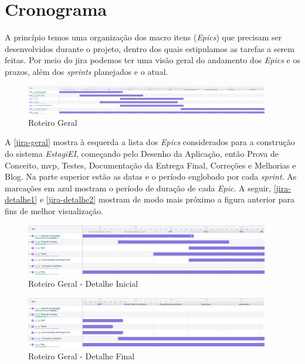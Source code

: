 \section{Cronograma}

A princípio temos uma organização dos macro itens (\textit{Epics}) que precisam ser desenvolvidos durante o projeto, dentro dos quais estipulamos as tarefas a serem feitas. Por meio do \gls{jira} podemos ter uma visão geral do andamento dos \textit{Epics} e os prazos, além dos \textit{\glspl{sprint}} planejados e o atual.

\begin{figure}[H]
	\centering
	\caption{\label{jira-geral}Roteiro Geral}
	\includegraphics[width=0.95\textwidth]{../imagens/cronograma-geral.png}
\end{figure}

A \autoref{jira-geral} mostra à esquerda a lista dos \textit{Epics} considerados para a construção do sistema \emph{EstagiEI}, começando pelo Desenho da Aplicação, então Prova de Conceito, \ac{mvp}, Testes, Documentação da Entrega Final, Correções e Melhorias e Blog. Na parte superior estão as datas e o período englobado por cada \textit{\gls{sprint}}. As marcações em azul mostram o período de duração de cada \textit{Epic}. A seguir, \autoref{jira-detalhe1} e \autoref{jira-detalhe2} mostram de modo mais próximo a figura anterior para fins de melhor visualização.

\begin{figure}[H]
	\centering
	\caption{\label{jira-detalhe1}Roteiro Geral - Detalhe Inicial}
	\includegraphics[width=0.95\textwidth]{../imagens/cronograma-detalhe1.png}
\end{figure}

\begin{figure}[H]
	\centering
	\caption{\label{jira-detalhe2}Roteiro Geral - Detalhe Final}
	\includegraphics[width=0.95\textwidth]{../imagens/cronograma-detalhe2.png}
\end{figure}

